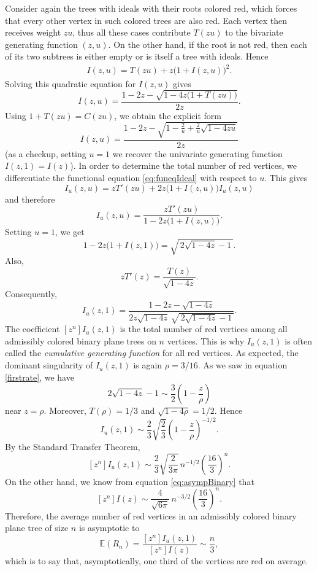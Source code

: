 \documentclass[10pt,a4paper]{amsart}
\theoremstyle{remark}
\begin{document}
Consider again the trees with ideals with their roots colored red, which forces that every other vertex in such colored trees are also red. Each vertex then receives weight $zu$, thus all these cases contribute $T(zu)$ to the bivariate generating function $(z,u)$. On the other hand, if the root is not red, then each of its two subtrees is either empty or is itself a tree with ideals. 
%
Hence
\begin{align}
\label{eq:funeqIdeal}
I(z,u)=T(zu)+z\big(1+I(z,u)\big)^2.
\end{align}
Solving this quadratic equation for $I(z,u)$ gives \[ I(z,u) = \frac{ 1-2z-\sqrt{1-4z\big(1+T(zu)\big)} }{2z}. \] Using
$1+T(zu) = C(zu)$,
we obtain the explicit form
\[  I(z,u) = \frac{ 1-2z- \sqrt{ 1-\frac{2}{u}+\frac{2}{u}\sqrt{1-4zu} } }{2z}  \]
%
(as a checkup, setting $u=1$ we recover the univariate generating function
$I(z,1) =I(z)$).
In order to determine the total number of red vertices, we differentiate the functional equation \eqref{eq:funeqIdeal} with respect to $u$. This gives
\[
I_u(z,u) = zT'(zu) + 2z\big(1+I(z,u)\big)I_u(z,u)
\]
and therefore
 \[
 I_u(z,u) = \frac{zT'(zu)} {1-2z\big(1+I(z,u)\big)}.
 \]
 Setting $u=1$, we get \[ 1-2z\big(1+I(z,1)\big) = \sqrt{\,2\sqrt{1-4z}-1\,}.
 \] Also, \[ zT'(z) = \frac{T(z)}{\sqrt{1-4z}}. \] Consequently,
 \[
 	{ I_u(z,1) = \frac{ 1-2z-\sqrt{1-4z} }{ 2z\sqrt{1-4z}\, \sqrt{\,2\sqrt{1-4z}-1\,} }. }
\]
The coefficient $[z^n]I_u(z,1)$ is the total number of red vertices among all admissibly colored binary plane trees on $n$ vertices. This is why $I_u(z,1)$ is often called the {\em cumulative generating function} 
for all red vertices. 
As expected, the dominant singularity of $I_u(z,1)$ is again $\rho=3/16$. 
As we saw in equation \eqref{firstrate}, we have
\[
	2\sqrt{1-4z}-1 \sim \frac{3}{2}\left(1-\frac{z}{\rho}\right)
\]
near $z=\rho$.
Moreover, $T(\rho)=1/3$ and $\sqrt{1-4\rho}=1/2$. Hence
\[
	I_u(z,1) \sim \frac{2}{3}\sqrt{\frac23} \left(1-\frac{z}{\rho}\right)^{-1/2}.
\]
By the Standard Transfer Theorem,
\[
[z^n]I_u(z,1) \sim \frac{2}{3}\sqrt{\frac{2}{3\pi}}\, n^{-1/2} \left(\frac{16}{3}\right)^n.
\]
On the other hand, we know from equation \eqref{eq:asympBinary} that
\[ [z^n]I(z) \sim \frac{4}{\sqrt{6\pi}}\, n^{-3/2} \left(\frac{16}{3}\right)^n.
\]
Therefore, the average number of red vertices in an admissibly colored binary plane tree of size $n$ is asymptotic to
\[
\mathbb{E}(R_n) = \frac{ [z^n]I_u(z,1) }{ [z^n]I(z) } \sim \frac{n}{3},
\]
which is to say that, asymptotically, one third of the vertices are red on average.
\end{document}
